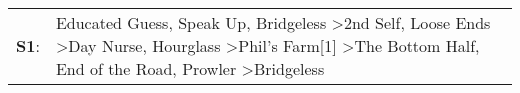 \begin{supertabular}{p{0.03\textwidth}p{0.92\textwidth}}
 \textbf{S1}:  &  Educated Guess\textsuperscript{}, \enspace Speak Up\textsuperscript{}, \enspace Bridgeless\textsuperscript{} \textgreater \enspace 2nd Self\textsuperscript{}, \enspace Loose Ends\textsuperscript{} \textgreater \enspace Day Nurse\textsuperscript{}, \enspace Hourglass\textsuperscript{} \textgreater \enspace Phil's Farm[1]\textsuperscript{} \textgreater \enspace The Bottom Half\textsuperscript{}, \enspace End of the Road\textsuperscript{}, \enspace Prowler\textsuperscript{} \textgreater \enspace Bridgeless\textsuperscript{}  \enspace  \\
\end{supertabular}
